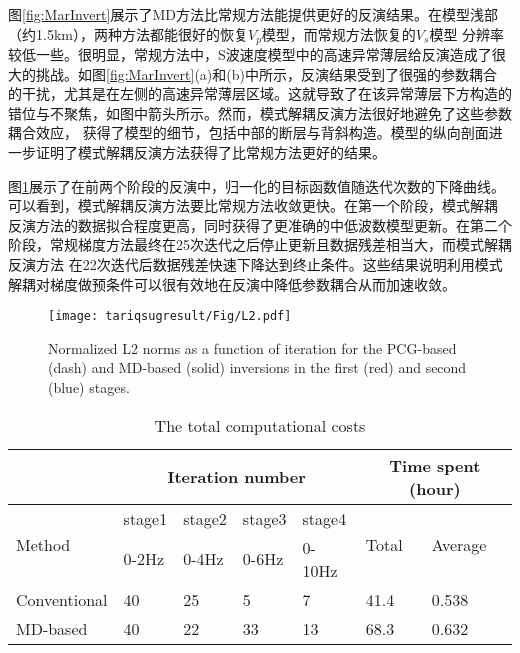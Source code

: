 图\ref{fig:MarInvert}展示了MD方法比常规方法能提供更好的反演结果。在模型浅部（约1.5km），两种方法都能很好的恢复$V_p$模型，而常规方法恢复的$V_s$模型
分辨率较低一些。很明显，常规方法中，S波速度模型中的高速异常薄层给反演造成了很大的挑战。如图\ref{fig:MarInvert}(a)和(b)中所示，反演结果受到了很强的参数耦合
的干扰，尤其是在左侧的高速异常薄层区域。这就导致了在该异常薄层下方构造的错位与不聚焦，如图中箭头所示。然而，模式解耦反演方法很好地避免了这些参数耦合效应，
获得了模型的细节，包括中部的断层与背斜构造。模型的纵向剖面进一步证明了模式解耦反演方法获得了比常规方法更好的结果。

图\ref{fig:L2}展示了在前两个阶段的反演中，归一化的目标函数值随迭代次数的下降曲线。可以看到，模式解耦反演方法要比常规方法收敛更快。在第一个阶段，模式解耦
反演方法的数据拟合程度更高，同时获得了更准确的中低波数模型更新。在第二个阶段，常规梯度方法最终在25次迭代之后停止更新且数据残差相当大，而模式解耦反演方法
在22次迭代后数据残差快速下降达到终止条件。这些结果说明利用模式解耦对梯度做预条件可以很有效地在反演中降低参数耦合从而加速收敛。
\begin{figure}
    \begin{center}
        \texttt{[image: tariqsugresult/Fig/L2.pdf]}
        \caption{
            Normalized L2 norms as a function of iteration for the PCG-based (dash)
            and MD-based (solid) inversions in the first (red) and second (blue)
            stages.
    }
    \label{fig:L2}
    \end{center}
\end{figure}
\begin{table}
    \caption{The total computational costs}
    \label{table:TotalComputime}
    \begin{tabular}{p{1.8cm}p{1.0cm}p{1.0cm}p{1.0cm}p{1.2cm}p{1.0cm}p{1.0cm}}
    \hline
    \quad&\multicolumn{4}{c}{Iteration number}&\multicolumn{2}{c}{Time spent (hour)} \\
    \hline
    \multirow{2}{*}{Method} & stage1 &stage2 &stage3 &stage4 &\multirow{2}{*}{Total}
    &\multirow{2}{*}{Average} \\
    & 0-2Hz &0-4Hz&0-6Hz&0-10Hz\\
    \hline
    Conventional&  40   &25&5& 7  &41.4&0.538\\
    MD-based &   40  & 22 &33 &13&68.3&0.632\\
    \hline
    \end{tabular}
\end{table}

